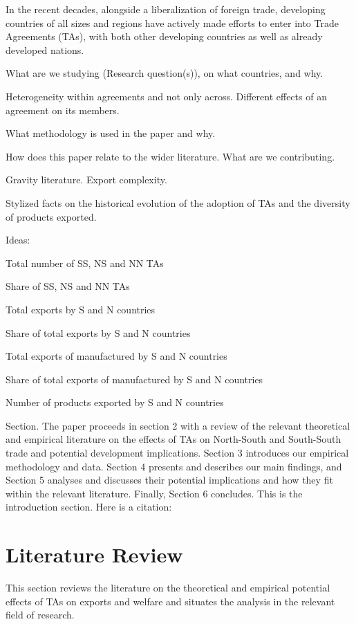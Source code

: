 \documentclass[12pt]{article}%
\begin{document}
In the recent decades, alongside a liberalization of foreign trade,
developing countries of all sizes and regions have actively made efforts
to enter into Trade Agreements (TAs), with both other developing
countries as well as already developed nations.

What are we studying (Research question(s)), on what countries, and why.

Heterogeneity within agreements and not only across. Different effects
of an agreement on its members.

What methodology is used in the paper and why.

How does this paper relate to the wider literature. What are we
contributing.

Gravity literature. Export complexity.

Stylized facts on the historical evolution of the adoption of TAs and
the diversity of products exported.

Ideas:

Total number of SS, NS and NN TAs

Share of SS, NS and NN TAs

Total exports by S and N countries

Share of total exports by S and N countries

Total exports of manufactured by S and N countries

Share of total exports of manufactured by S and N countries

Number of products exported by S and N countries

Section. The paper proceeds in section 2 with a review of the relevant
theoretical and empirical literature on the effects of TAs on
North-South and South-South trade and potential development
implications. Section 3 introduces our empirical methodology and data.
Section 4 presents and describes our main findings, and Section 5
analyses and discusses their potential implications and how they fit
within the relevant literature. Finally, Section 6 concludes.
%
This is the introduction section. Here is a citation: %
\cite{dahi_preferential_2013}

%
\section{Literature Review}%
\label{sec:LiteratureReview}%
This section reviews the literature on the theoretical and empirical potential effects of TAs on exports and welfare and situates the analysis in the relevant field of research.%
\end{document}
